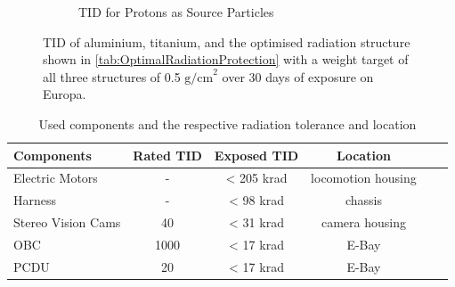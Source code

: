 \begin{figure}[htb]
\begin{subfigure}[b]{0.49\textwidth}
         \caption{TID for Protons as Source Particles}
         \label{fig:TIDProtonShielding}
     \end{subfigure}
     \caption{TID of aluminium, titanium, and the optimised radiation structure shown in \autoref{tab:OptimalRadiationProtection} with a weight target of all three structures of 0.5 \(\text{g/cm}^2\) over 30 days of exposure on Europa.}
     \label{fig:AluminiumTitanOptimised}
\end{figure}

\begin{table}[htb]
\centering
\caption{Used components and the respective radiation tolerance and location}
\begin{adjustbox}{max width=\textwidth}
\begin{tabular}[l]{lccccc}

	\toprule
		Components	&	Rated TID	&	Exposed TID	&	Location\\
	\midrule
	
	Electric Motors	&	-	&	< 205 krad	&	locomotion housing\\	
	
	Harness	&	-	&	< 98 krad	&	chassis\\	
	
	Stereo Vision Cams	&	40	&	< 31 krad	&	camera housing\\	
	
	OBC	&	1000	&	< 17 krad	&	E-Bay\\
	
	PCDU	&	20	&	< 17 krad	&	E-Bay\\
	

	\bottomrule

\end{tabular}
\end{adjustbox}
\label{tab:RadiationList}
\end{table}

